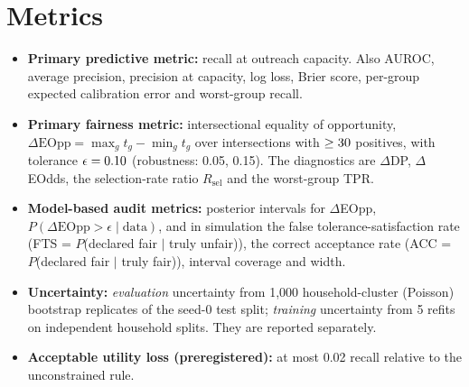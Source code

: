 \documentclass[10pt]{article}
\begin{document}
\section{Metrics}
\begin{itemize}
  \item \textbf{Primary predictive metric:} recall at \capacity{} outreach capacity. Also AUROC, average precision,
    precision at capacity, log loss, Brier score, per-group expected calibration error and worst-group recall.
  \item \textbf{Primary fairness metric:} intersectional equality of opportunity,
    $\Delta\text{EOpp}=\max_g t_g-\min_g t_g$ over intersections with $\ge30$ positives, with tolerance
    $\epsilon=0.10$ (robustness: 0.05, 0.15). The diagnostics are $\Delta$DP, $\Delta$EOdds, the selection-rate
    ratio $R_{\text{sel}}$ and the worst-group TPR.
  \item \textbf{Model-based audit metrics:} posterior intervals for $\Delta$EOpp, $P(\Delta\text{EOpp}>\epsilon\mid\text{data})$,
    and in simulation the false tolerance-satisfaction rate (FTS = $P$(declared fair $\mid$ truly unfair)), the correct
    acceptance rate (ACC = $P$(declared fair $\mid$ truly fair)), interval coverage and width.
  \item \textbf{Uncertainty:} \emph{evaluation} uncertainty from 1,000 household-cluster (Poisson) bootstrap replicates of
    the seed-0 test split; \emph{training} uncertainty from 5 refits on independent household splits. They are reported separately.
  \item \textbf{Acceptable utility loss (preregistered):} at most 0.02 recall relative to the unconstrained rule.
\end{itemize}
\end{document}
